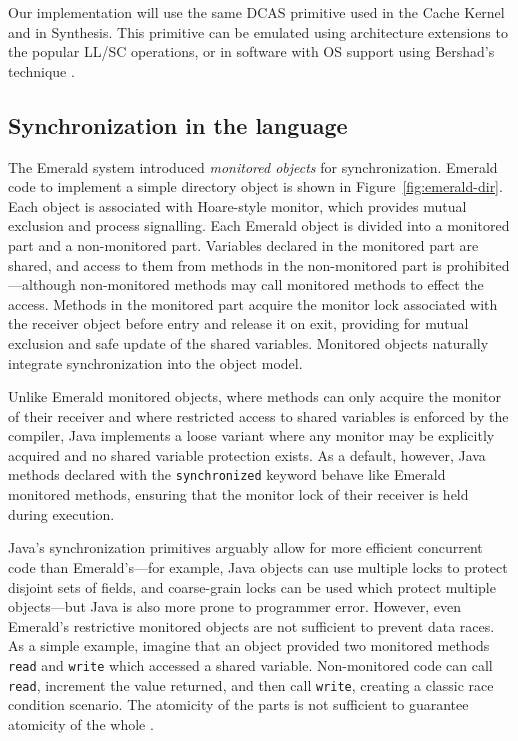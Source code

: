 \documentclass[preprint]{rdbacmconf}
\begin{document}
Our implementation will use the same DCAS primitive used in the Cache
Kernel and in Synthesis.  This primitive can be emulated using
architecture extensions to the popular LL/SC operations,
or in software with OS support using Bershad's technique
\cite{GreenwaldCh96,Bershad93}.

\subsection{Synchronization in the language}
The Emerald system \cite{BlackHuJuLe86,JulSt91} introduced
\emph{monitored objects} for synchronization.  Emerald code to
implement a simple directory object is shown in
Figure~\ref{fig:emerald-dir}.  Each object is associated with
Hoare-style monitor, which provides mutual exclusion and process
signalling.  Each Emerald object is divided into a monitored part and
a non-monitored part.  Variables declared in the monitored part are
shared, and access to them from methods in the non-monitored part is
prohibited---although non-monitored methods may call monitored methods
to effect the access.  Methods in the monitored part acquire the monitor lock
associated with the receiver object before entry and release it on
exit, providing for mutual exclusion and safe update of the shared
variables.  Monitored objects naturally integrate synchronization into
the object model.

Unlike Emerald monitored objects, where methods can only acquire the
monitor of their receiver and where restricted access to shared
variables is enforced by the compiler, Java implements a loose
variant where any monitor may be explicitly acquired and no shared
variable protection exists.  As a default, however, Java methods
declared with the {\tt synchronized} keyword behave like Emerald
monitored methods,
ensuring that the monitor lock of their receiver is held during execution.

Java's synchronization primitives arguably allow for more efficient
concurrent code than Emerald's---for example, Java objects can use
multiple locks to
protect disjoint sets of fields, and coarse-grain locks can be used
which protect multiple objects---but Java is also more prone to programmer
error.  However, even Emerald's restrictive
monitored objects are not sufficient to prevent data races.  As a
simple example, imagine that an object provided two monitored methods
{\tt read} and {\tt write} which accessed a shared variable.
Non-monitored code can call {\tt read}, increment the value returned,
and then call {\tt write}, creating a classic race condition scenario.
The atomicity of the parts is not sufficient to guarantee atomicity of
the whole \cite{FlanaganQa03}.
\end{document}
